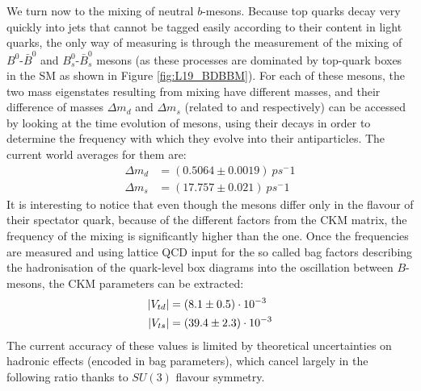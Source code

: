 \documentclass[../../main/main.tex]{subfiles}
\begin{document}
We turn now to the mixing of neutral \( b \)-mesons. Because top quarks decay very quickly into jets that cannot be tagged easily according to their content in light quarks, the only way of measuring is through the measurement of the mixing of \( B^0 \)-\( \bar{B}^0 \) and \( B^0_s \)-\( \bar{B}^0_s \) mesons (as these processes are dominated by top-quark boxes in the SM as shown in Figure \ref{fig:L19_BDBBM}). For each of these mesons, the two mass eigenstates resulting from mixing have different masses, and their difference of masses \( \Delta m_d \) and \( \Delta m_s \) (related to and respectively) can be accessed by looking at the time evolution of mesons, using their decays in order to determine the frequency with which they evolve into their antiparticles. The current world averages for them are:
\begin{align}
	\Delta m_d &= (0.5064 \pm 0.0019) \ \si{ps^-1}	\\
	\Delta m_s &= (17.757 \pm 0.021)  \ \si{ps^-1}
\end{align}
It is interesting to notice that even though the mesons differ only in the flavour of their spectator quark, because of the different factors from the CKM matrix, the frequency of the mixing is significantly higher than the one. Once the frequencies are measured and using lattice QCD input for the so called bag factors describing the hadronisation of the quark-level box diagrams into the oscillation between \( B \)-mesons, the CKM parameters can be extracted:
\begin{align}
	\abs{V_{td}} &= ( 8.1 \pm 0.5) \cdot 10^{-3}	\\
	\abs{V_{ts}} &= (39.4 \pm 2.3) \cdot 10^{-3}
\end{align}
The current accuracy of these values is limited by theoretical uncertainties on hadronic effects (encoded in bag parameters), which cancel largely in the following ratio thanks to \( SU(3) \) flavour symmetry.
\end{document}
